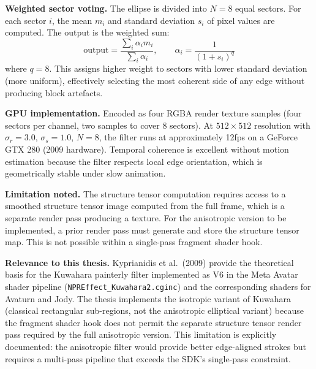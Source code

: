 \documentclass[11pt, a4paper]{article}
\begin{document}
\textbf{Weighted sector voting.} The ellipse is divided into $N = 8$ equal sectors. For each sector $i$, the mean $m_i$ and standard deviation $s_i$ of pixel values are computed. The output is the weighted sum:
\[
  \text{output} = \frac{\sum_i \alpha_i m_i}{\sum_i \alpha_i}, \qquad \alpha_i = \frac{1}{(1 + s_i)^q}
\]
where $q = 8$. This assigns higher weight to sectors with lower standard deviation (more uniform), effectively selecting the most coherent side of any edge without producing block artefacts.

\textbf{GPU implementation.} Encoded as four RGBA render texture samples (four sectors per channel, two samples to cover 8 sectors). At $512\times512$ resolution with $\sigma_r = 3.0$, $\sigma_s = 1.0$, $N = 8$, the filter runs at approximately 12fps on a GeForce GTX 280 (2009 hardware). Temporal coherence is excellent without motion estimation because the filter respects local edge orientation, which is geometrically stable under slow animation.

\textbf{Limitation noted.} The structure tensor computation requires access to a smoothed structure tensor image computed from the full frame, which is a separate render pass producing a texture. For the anisotropic version to be implemented, a prior render pass must generate and store the structure tensor map. This is not possible within a single-pass fragment shader hook.

\textbf{Relevance to this thesis.} Kyprianidis et al.\ (2009) provide the theoretical basis for the Kuwahara painterly filter implemented as V6 in the Meta Avatar shader pipeline (\texttt{NPREffect\_Kuwahara2.cginc}) and the corresponding shaders for Avaturn and Jody. The thesis implements the isotropic variant of Kuwahara (classical rectangular sub-regions, not the anisotropic elliptical variant) because the fragment shader hook does not permit the separate structure tensor render pass required by the full anisotropic version. This limitation is explicitly documented: the anisotropic filter would provide better edge-aligned strokes but requires a multi-pass pipeline that exceeds the SDK's single-pass constraint.
\end{document}
